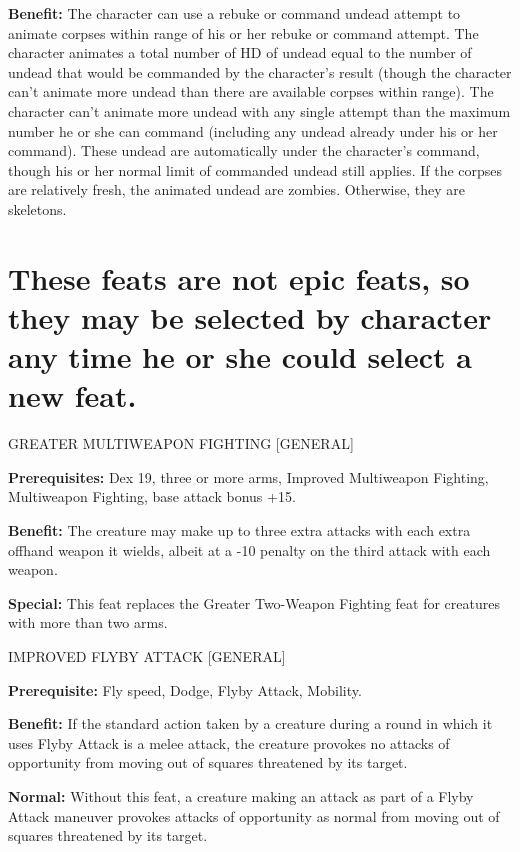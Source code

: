 \documentclass{article}
\begin{document}
\textbf{Benefit:} The character can use a rebuke or command undead attempt to animate 
corpses within range of his or her rebuke or command attempt. The character animates 
a total number of HD of undead equal to the number of undead that would be commanded 
by the character's result (though the character can't animate more undead than 
there are available corpses within range). The character can't animate more undead 
with any single attempt than the maximum number he or she can command (including 
any undead already under his or her command). These undead are automatically under 
the character's command, though his or her normal limit of commanded undead still 
applies. If the corpses are relatively fresh, the animated undead are zombies. 
Otherwise, they are skeletons.

\vspace{36pt}
\section*{These feats are not epic feats, so they may be selected by character 
any time he or she could select a new feat.}

\vspace{12pt}
GREATER MULTIWEAPON FIGHTING [GENERAL]

\textbf{Prerequisites:} Dex 19, three or more arms, Improved Multiweapon Fighting, 
Multiweapon Fighting, base attack bonus +15.

\textbf{Benefit:} The creature may make up to three extra attacks with each extra 
offhand weapon it wields, albeit at a -10 penalty on the third attack with each 
weapon.

\textbf{Special:} This feat replaces the Greater Two-Weapon Fighting feat for creatures 
with more than two arms.

\vspace{12pt}
IMPROVED FLYBY ATTACK [GENERAL] 

\textbf{Prerequisite:} Fly speed, Dodge, Flyby Attack, Mobility. 

\textbf{Benefit:} If the standard action taken by a creature during a round in 
which it uses Flyby Attack is a melee attack, the creature provokes no attacks 
of opportunity from moving out of squares threatened by its target.

\textbf{Normal:} Without this feat, a creature making an attack as part of a Flyby 
Attack maneuver provokes attacks of opportunity as normal from moving out of squares 
threatened by its target.
\end{document}
